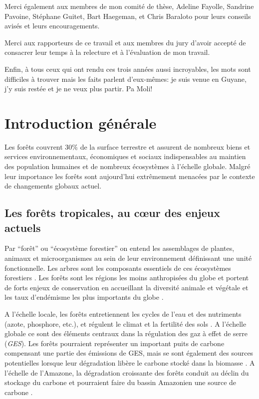 \documentclass[
  11pt,
  french,
  A4paper,
  extrafontsizes,onecolumn,openright
  ]{memoir}
\begin{document}
Merci également aux membres de mon comité de thèse, Adeline Fayolle,
Sandrine Pavoine, Stéphane Guitet, Bart Haegeman, et Chris Baraloto pour
leurs conseils avisés et leurs encouragements.

Merci aux rapporteurs de ce travail et aux membres du jury d'avoir
accepté de consacrer leur temps à la relecture et à l'évaluation de mon
travail.

Enfin, à tous ceux qui ont rendu ces trois années aussi incroyables, les
mots sont difficiles à trouver mais les faits parlent d'eux-mêmes: je
suis venue en Guyane, j'y suis restée et je ne veux plus partir. Pa
Moli!

\chapter{Introduction générale}\label{introduction-generale}

Les forêts couvrent 30\% de la surface terrestre et assurent de nombreux
biens et services environnementaux, économiques et sociaux
indispensables au maintien des population humaines et de nombreux
écosystèmes à l'échelle globale. Malgré leur importance les forêts sont
aujourd'hui extrêmement menacées par le contexte de changements globaux
actuel.

\section{Les forêts tropicales, au cœur des enjeux
actuels}\label{les-forets-tropicales-au-cur-des-enjeux-actuels}

Par ``forêt'' ou ``écosystème forestier'' on entend les assemblages de
plantes, animaux et microorganismes au sein de leur environnement
définissant une unité fonctionnelle. Les arbres sont les composants
essentiels de ces écosystèmes forestiers \autocite{FRA2000}. Les forêts
sont les régions les moins anthropisées du globe et portent de forts
enjeux de conservation en accueillant la diversité animale et végétale
et les taux d'endémisme les plus importants du globe
\autocites{Myers2000}{Mittermeier2003}.

A l'échelle locale, les forêts entretiennent les cycles de l'eau et des
nutriments (azote, phosphore, etc.), et régulent le climat et la
fertilité des sols \autocites{Malhi2008}{Isbell2017}. A l'échelle
globale ce sont des éléments centraux dans la régulation des gaz à effet
de serre (\emph{GES}). Les forêts pourraient représenter un important
puits de carbone compensant une partie des émissions de GES, mais se
sont également des sources potentielles lorsque leur dégradation libère
le carbone stocké dans la biomasse \autocites{Pan2011}{Roy2017}. A
l'échelle de l'Amazone, la dégradation croissante des forêts conduit au
déclin du stockage du carbone et pourraient faire du bassin Amazonien
une source de carbone \autocite{Brienen2015}.
\end{document}
